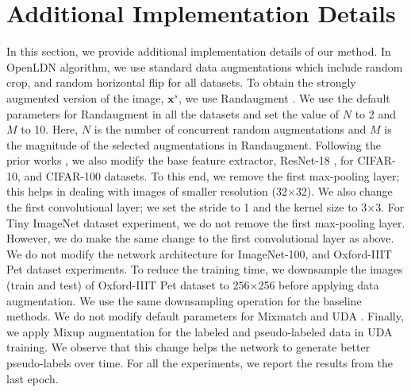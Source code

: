 \documentclass[runningheads]{eccv2022submission}
\begin{document}
\section{Additional Implementation Details}
\label{sec:implementation}
In this section, we provide additional implementation details of our method. In OpenLDN algorithm, we use standard data augmentations which include random crop, and random horizontal flip for all datasets. To obtain the strongly augmented version of the image, $\mathbf{x}^s$, we use Randaugment \cite{cubuk2020randaugment}. We use the default parameters for Randaugment in all the datasets and set the value of $N$ to 2 and $M$ to 10. Here, $N$ is the number of concurrent random augmentations and $M$ is the magnitude of the selected augmentations in Randaugment. Following the prior works \cite{Han2020Automatically,cao2022openworld}, we also modify the base feature extractor, ResNet-18 \cite{he2016deep}, for CIFAR-10, and CIFAR-100 datasets. To this end, we remove the first max-pooling layer; this helps in dealing with images of smaller resolution (32$\times$32). We also change the first convolutional layer; we set the stride to 1 and the kernel size to 3$\times$3. For Tiny ImageNet dataset experiment, we do not remove the first max-pooling layer. However, we do make the same change to the first convolutional layer as above. We do not modify the network architecture for ImageNet-100, and Oxford-IIIT Pet dataset experiments. To reduce the training time, we downsample the images (train and test) of Oxford-IIIT Pet dataset to 256$\times$256 before applying data augmentation. We use the same downsampling operation for the baseline methods. We do not modify default parameters for Mixmatch \cite{NIPS2019_8749_MixMatch} and UDA \cite{xie2019unsupervised}. Finally, we apply Mixup \cite{zhang2018mixup} augmentation for the labeled and pseudo-labeled data in UDA training. We observe that this change helps the network to generate better pseudo-labels over time. For all the experiments, we report the results from the last epoch.          
      
\end{document}
